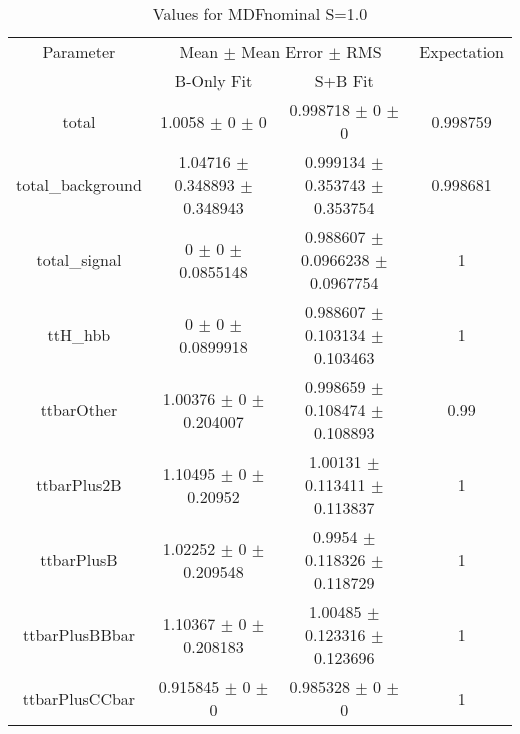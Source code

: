 \begin{table}
\centering
\caption{Values for MDFnominal S=1.0}
\begin{tabular}{cccc}
\toprule
Parameter & \multicolumn{2}{c}{Mean $\pm$ Mean Error $\pm$ RMS} & Expectation\\
 & B-Only Fit & S+B Fit & \\
\midrule
total & \num{1.0058} $\pm$ \num{0} $\pm$ \num{0} & \num{0.998718} $\pm$ \num{0} $\pm$ \num{0} & \num{0.998759}\\
total\_background & \num{1.04716} $\pm$ \num{0.348893} $\pm$ \num{0.348943} & \num{0.999134} $\pm$ \num{0.353743} $\pm$ \num{0.353754} & \num{0.998681}\\
total\_signal & \num{0} $\pm$ \num{0} $\pm$ \num{0.0855148} & \num{0.988607} $\pm$ \num{0.0966238} $\pm$ \num{0.0967754} & \num{1}\\
ttH\_hbb & \num{0} $\pm$ \num{0} $\pm$ \num{0.0899918} & \num{0.988607} $\pm$ \num{0.103134} $\pm$ \num{0.103463} & \num{1}\\
ttbarOther & \num{1.00376} $\pm$ \num{0} $\pm$ \num{0.204007} & \num{0.998659} $\pm$ \num{0.108474} $\pm$ \num{0.108893} & \num{0.99}\\
ttbarPlus2B & \num{1.10495} $\pm$ \num{0} $\pm$ \num{0.20952} & \num{1.00131} $\pm$ \num{0.113411} $\pm$ \num{0.113837} & \num{1}\\
ttbarPlusB & \num{1.02252} $\pm$ \num{0} $\pm$ \num{0.209548} & \num{0.9954} $\pm$ \num{0.118326} $\pm$ \num{0.118729} & \num{1}\\
ttbarPlusBBbar & \num{1.10367} $\pm$ \num{0} $\pm$ \num{0.208183} & \num{1.00485} $\pm$ \num{0.123316} $\pm$ \num{0.123696} & \num{1}\\
ttbarPlusCCbar & \num{0.915845} $\pm$ \num{0} $\pm$ \num{0} & \num{0.985328} $\pm$ \num{0} $\pm$ \num{0} & \num{1}\\
\bottomrule
\end{tabular}
\end{table}